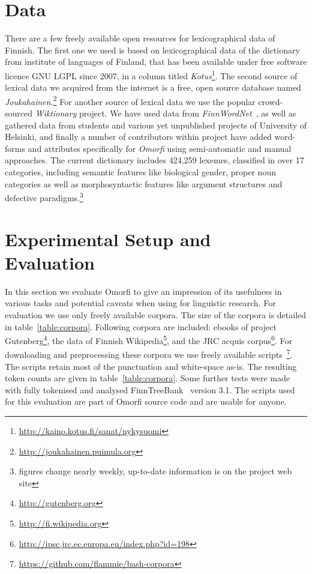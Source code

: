 \documentclass[preprint]{flammie}
\begin{document}
\section{Data}
\label{sec:data}

There are a few freely available open resources for lexicographical data of
Finnish. The first one we used is based on lexicographical data of the
dictionary from institute of languages of Finland, that has been available
under free software licence GNU LGPL since 2007, in a column titled
\textit{Kotus}\footnote{\url{http://kaino.kotus.fi/sanat/nykysuomi}}.  The
second source of lexical data we acquired from the internet is a free, open
source database named
\textit{Joukahainen.}\footnote{\url{http://joukahainen.puimula.org}} For
another source of lexical data we use the popular crowd-sourced
\textit{Wiktionary} project.  We have used data from
\textit{FinnWordNet}~\citep{linden2010finnwordnet}, as well as gathered data
from students and various yet unpublished projects of University of Helsinki,
and finally a number of contributors within project have added word-forms and
attributes specifically for \textit{Omorfi} using semi-automatic and manual
approaches. The current dictionary includes 424,259 lexemes, classified in over
17 categories, including semantic features like biological gender, proper noun
categories as well as morphosyntactic features like argument structures and
defective paradigms.\footnote{figures change nearly weekly, up-to-date
information is on the project web site}



\section{Experimental Setup and Evaluation}
\label{sec:evaluation}

In this section we evaluate Omorfi to give an impression of its usefulness
in various tasks and potential caveats when using for linguistic research.
For evaluation we use only freely available corpora. The size of the corpora
is detailed in table~\ref{table:corpora}. Following corpora are included:
ebooks of project Gutenberg\footnote{\url{http://gutenberg.org}}, the data
of Finnish Wikipedia\footnote{\url{http://fi.wikipedia.org}}, and the JRC
acquis corpus\footnote{\url{http://ipsc.jrc.ec.europa.eu/index.php?id=198}}.
For downloading and preprocessing these corpora we use freely available
scripts~\footnote{\url{https://github.com/flammie/bash-corpora}}. The
scripts retain most of the punctuation and white-space as-is. The resulting
token counts are given in table~\ref{table:corpora}. Some further tests were
made with fully tokenised and analysed
FinnTreeBank~\citep{voutilainen2012specifying} version 3.1.  The scripts
used for this evaluation are part of Omorfi source code and are usable for
anyone.
\end{document}
